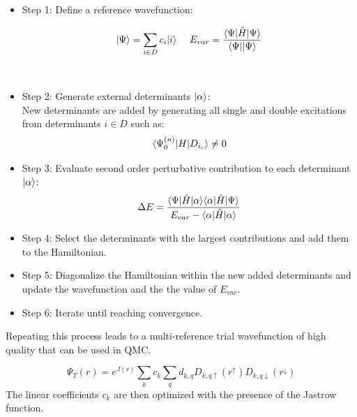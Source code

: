 \begin{itemize}
\item Step 1: Define a reference wavefunction:

    \begin{equation}
     \begin{gathered}
       \begin{aligned}
         \ket{\Psi}&=\sum_{i\in D} c_i\ket{i} \,         \,
         &E_{var}&= \frac{\bra{\Psi}\hat{H}\ket{\Psi}}{\bra{\Psi}\ket{\Psi}} \\[12pt]
       \end{aligned} \\[12pt]
     \end{gathered}
   \end{equation}

 
 \item Step 2: Generate external determinants $\ket{\alpha}$:\\
New determinants are added by generating all single and double excitations from determinants $i \in D$ such as:\\ 
\begin{equation}
\bra{\Psi_0^{(n)}}H\ket{D_{i_c}}\neq 0
\end{equation}

\item Step 3: Evaluate second order perturbative contribution to each determinant $\ket{\alpha}$:
\begin{equation}
\Delta E=\frac{\bra{\Psi}\hat{H}\ket{\alpha}\bra{\alpha}\hat{H}\ket{\Psi}}{E_{var}-\bra{\alpha}\hat{H}\ket{\alpha}}
\end{equation}

\item Step 4: Select the determinants with the largest contributions and add them to the Hamiltonian.
\item Step 5: Diagonalize the Hamiltonian within the new added determinants and update the wavefunction and the the value of $E_{var}$.
\item Step 6: Iterate until reaching convergence.\\
\end{itemize}
Repeating this process leads to a multi-reference trial wavefunction of high quality that can be used in QMC. 

\begin{equation}
\Psi_T(r)=e^{J(r)}\sum_k c_k \sum_q d_{k,q}D_{k,q\uparrow } (r^{\uparrow})D_{k,q\downarrow}(r^{\downarrow})
\end{equation}
The linear coefficients $c_k$ are then optimized with the presence of the Jastrow function. 

